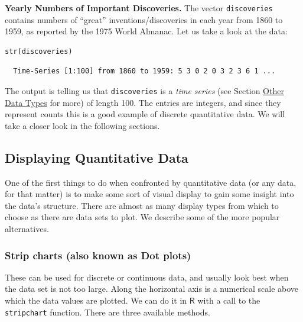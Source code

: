 \documentclass[captions=tableheading]{scrbook}
\begin{document}
\begin{example}
\textbf{Yearly Numbers of Important Discoveries.} The vector \texttt{discoveries} contains numbers of “great” inventions/discoveries in each year from 1860 to 1959, as reported by the 1975 World Almanac. Let us take a look at the data:


\lstset{language=R}
\begin{lstlisting}
str(discoveries)
\end{lstlisting}

\begin{verbatim}
  Time-Series [1:100] from 1860 to 1959: 5 3 0 2 0 3 2 3 6 1 ...
\end{verbatim}

\end{example}

The output is telling us that \texttt{discoveries} is a \emph{time series} (see Section \href{file://~/git/IPSUR/.outputlatexdata-description}{Other Data Types} for more) of length 100. The entries are integers, and since they represent counts this is a good example of discrete quantitative data. We will take a closer look in the following sections.
\subsection{Displaying Quantitative Data}
\label{sec-3-1-2}
\label{sub-Displaying-Quantitative-Data}


One of the first things to do when confronted by quantitative data (or any data, for that matter) is to make some sort of visual display to gain some insight into the data's structure. There are almost as many display types from which to choose as there are data sets to plot. We describe some of the more popular alternatives. 
\subsubsection{Strip charts (also known as Dot plots)}
\label{sec-3-1-2-1}
\label{par:Strip-charts}


These can be used for discrete or continuous data, and usually look best when the data set is not too large. Along the horizontal axis is a numerical scale above which the data values are plotted. We can do it in \(\mathsf{R}\) with a call to the \texttt{stripchart} function. There are three available methods.
\end{document}
